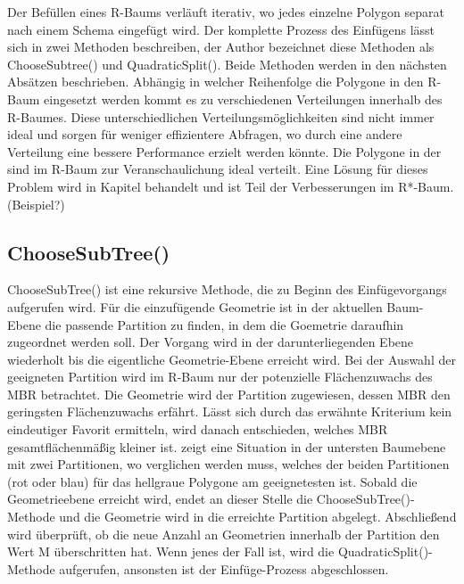 \documentclass[runningheads,a4paper]{llncs}
\begin{document}
Der Befüllen eines R-Baums verläuft iterativ, wo jedes einzelne Polygon separat nach einem Schema eingefügt wird. Der komplette Prozess des Einfügens lässt sich in zwei Methoden beschreiben, der Author bezeichnet diese Methoden als ChooseSubtree() und QuadraticSplit(). Beide Methoden werden in den nächsten Absätzen beschrieben. Abhängig in welcher Reihenfolge die Polygone in den R-Baum eingesetzt werden kommt es zu verschiedenen Verteilungen innerhalb des R-Baumes. Diese unterschiedlichen Verteilungsmöglichkeiten sind nicht immer ideal und sorgen für weniger effizientere Abfragen, wo durch eine andere Verteilung eine bessere Performance erzielt werden könnte. Die Polygone in der  sind im R-Baum zur Veranschaulichung ideal verteilt. Eine Lösung für dieses Problem wird in Kapitel  behandelt und ist Teil der Verbesserungen im R*-Baum.(Beispiel?)

\subsection{ChooseSubTree()}
\label{sec:r-choose-sub}
ChooseSubTree() ist eine rekursive Methode, die zu Beginn des Einfügevorgangs aufgerufen wird. Für die einzufügende Geometrie ist in der aktuellen Baum-Ebene die passende Partition zu finden, in dem die Goemetrie daraufhin zugeordnet werden soll. Der Vorgang wird in der darunterliegenden Ebene wiederholt bis die eigentliche Geometrie-Ebene erreicht wird. Bei der Auswahl der geeigneten Partition wird im R-Baum nur der potenzielle Flächenzuwachs des \acs{MBR} betrachtet. Die Geometrie wird der Partition zugewiesen, dessen \acs{MBR} den geringsten Flächenzuwachs erfährt. Lässt sich durch das erwähnte Kriterium kein eindeutiger Favorit ermitteln, wird danach entschieden, welches \acs{MBR} gesamtflächenmäßig kleiner ist.  zeigt eine Situation in der untersten Baumebene mit zwei Partitionen, wo verglichen werden muss, welches der beiden Partitionen (rot oder blau) für das hellgraue Polygone am geeignetesten ist. Sobald die Geometrieebene erreicht wird, endet an dieser Stelle die ChooseSubTree()-Methode und die Geometrie wird in die erreichte Partition abgelegt. Abschließend wird überprüft, ob die neue Anzahl an Geometrien innerhalb der Partition den Wert \acs{M} überschritten hat. Wenn jenes der Fall ist, wird die QuadraticSplit()-Methode aufgerufen, ansonsten ist der Einfüge-Prozess abgeschlossen.
\end{document}
